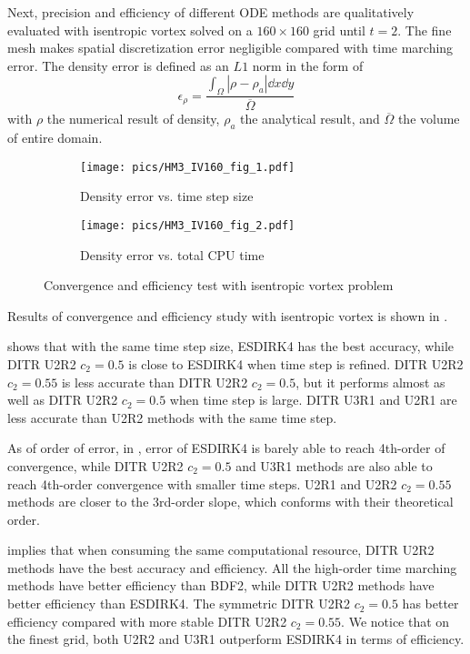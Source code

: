 Next, precision and efficiency of different ODE methods are
qualitatively evaluated with isentropic vortex solved on a $160\times160$
grid until $t=2$.
The fine mesh makes spatial
discretization error negligible compared with
time marching error.
The density error is defined as an $L1$ norm in the form of
\begin{equation}
    \epsilon_\rho = \frac{\int_\Omega{|\rho-\rho_a| \dd x\dd y}}{
        \overline{\Omega}
    }
\end{equation}
with  $\rho$ the numerical result of density,
$\rho_a$ the analytical result, 
and $\overline{\Omega}$ the volume of entire domain.



\begin{figure}[htbp]
    \centering
    \begin{subfigure}{0.5\textwidth}
        \texttt{[image: pics/HM3\_IV160\_fig\_1.pdf]}
        \caption[]{Density error vs. time step size }
        \label{sfig:IVTests_Conv}
    \end{subfigure}\hfill
    \begin{subfigure}{0.5\textwidth}
        \texttt{[image: pics/HM3\_IV160\_fig\_2.pdf]}
        \caption[]{Density error vs. total CPU time}
        \label{sfig:IVTests_Eff}
    \end{subfigure}
    \caption[]{Convergence and efficiency test with isentropic vortex problem}
    \label{fig:IVTests}
\end{figure}

Results of convergence and efficiency study with isentropic vortex is
shown in .

 shows that with the same time step size,
ESDIRK4 has the best accuracy, while DITR U2R2 $c_2=0.5$ is close to
ESDIRK4 when time step is refined. DITR U2R2 $c_2=0.55$ is less accurate
than DITR U2R2 $c_2=0.5$, but it performs almost as well as
DITR U2R2 $c_2=0.5$ when time step is large.
DITR U3R1 and U2R1 are less accurate than U2R2 methods with
the same time step.

As of order of error, in ,
error of ESDIRK4 is barely able to reach 4th-order of convergence,
while DITR U2R2 $c_2=0.5$ and U3R1 methods are also able to reach
4th-order convergence with smaller time steps. U2R1 and U2R2 $c_2=0.55$
methods are closer to the 3rd-order slope, which conforms with
their theoretical order.

implies that when consuming the same computational resource,
DITR U2R2 methods have the best accuracy and efficiency.
All the high-order
time marching methods have better efficiency than BDF2,
while DITR U2R2 methods have better efficiency than ESDIRK4.
The symmetric DITR U2R2 $c_2=0.5$ has better efficiency
compared with more stable DITR U2R2 $c_2=0.55$. 
We notice that on the finest grid, 
both U2R2 and U3R1 outperform ESDIRK4 in terms of efficiency.


